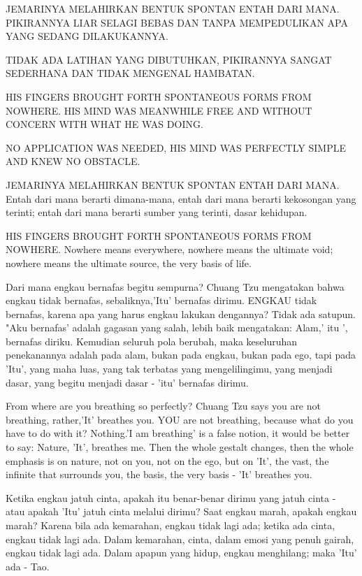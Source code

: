 \bahasa
JEMARINYA MELAHIRKAN BENTUK SPONTAN ENTAH DARI MANA. PIKIRANNYA LIAR SELAGI BEBAS DAN TANPA MEMPEDULIKAN APA YANG SEDANG DILAKUKANNYA.

TIDAK ADA LATIHAN YANG DIBUTUHKAN, PIKIRANNYA SANGAT SEDERHANA DAN TIDAK MENGENAL HAMBATAN.

\english
HIS FINGERS BROUGHT FORTH SPONTANEOUS FORMS FROM NOWHERE. HIS MIND WAS MEANWHILE FREE AND WITHOUT CONCERN WITH WHAT HE WAS DOING.

NO APPLICATION WAS NEEDED, HIS MIND WAS PERFECTLY SIMPLE AND KNEW NO OBSTACLE.

\bahasa
JEMARINYA MELAHIRKAN BENTUK SPONTAN ENTAH DARI MANA. Entah dari mana berarti dimana-mana, entah dari mana berarti kekosongan yang terinti; entah dari mana berarti sumber yang terinti, dasar kehidupan.

\english
HIS FINGERS BROUGHT FORTH SPONTANEOUS FORMS FROM NOWHERE. Nowhere means everywhere, nowhere means the ultimate void; nowhere means the ultimate source, the very basis of life.

\bahasa
Dari mana engkau bernafas begitu sempurna? Chuang Tzu mengatakan bahwa engkau tidak bernafas, sebaliknya,'Itu' bernafas dirimu. ENGKAU tidak bernafas, karena apa yang harus engkau lakukan dengannya? Tidak ada satupun. "Aku bernafas' adalah gagasan yang salah, lebih baik mengatakan: Alam,' itu ', bernafas diriku. Kemudian seluruh pola berubah, maka keseluruhan penekanannya adalah pada alam, bukan pada engkau, bukan pada ego, tapi pada 'Itu', yang maha luas, yang tak terbatas yang mengelilingimu, yang menjadi dasar, yang begitu menjadi dasar - 'itu' bernafas dirimu.

\english
From where are you breathing so perfectly? Chuang Tzu says you are not breathing, rather,'It' breathes you. YOU are not breathing, because what do you have to do with it? Nothing.'I am breathing' is a false notion, it would be better to say: Nature, 'It', breathes me. Then the whole gestalt changes, then the whole emphasis is on nature, not on you, not on the ego, but on 'It', the vast, the infinite that surrounds you, the basis, the very basis - 'It' breathes you.

\bahasa
Ketika engkau jatuh cinta, apakah itu benar-benar dirimu yang jatuh cinta - atau apakah 'Itu' jatuh cinta melalui dirimu? Saat engkau marah, apakah engkau marah? Karena bila ada kemarahan, engkau tidak lagi ada; ketika ada cinta, engkau tidak lagi ada. Dalam kemarahan, cinta, dalam emosi yang penuh gairah, engkau tidak lagi ada. Dalam apapun yang hidup, engkau menghilang; maka 'Itu' ada - Tao.

